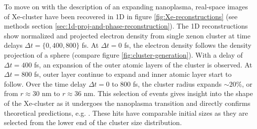 To move on with the description of an expanding nanoplasma, real-space images of Xe-cluster have been recovered in 1D in figure \ref{fig:Xe-reconstructions} (see methods section \ref{sec:1d-proj-and-phase-reconstruction}). The 1D reconstructions show normalized and projected electron density from single xenon cluster at time delays $\Delta t=\{0, 400, 800\}$ fs. At $\Delta t = 0$ fs, the electron density follows the density projection of a sphere (compare figure \ref{fig:cluster-generation}). With a delay of $\Delta t = 400$ fs, an expansion of the outer atomic layers of the cluster is observed. At $\Delta t = 800$ fs, outer layer continue to expand and inner atomic layer start to follow. Over the time delay $\Delta t=0$ to $800$ fs, the cluster radius expands $\sim 20\%$, or from $r\approx 30$ nm to $r\approx 36$ nm. This selection of events gives insight into the shape of the Xe-cluster as it undergoes the nanoplasma transition and directly confirms theoretical predictions, e.g. \citep{Hau-Riege-2004-PRE}. These hits have comparable initial sizes as they are selected from the lower end of the cluster size distribution.\\
